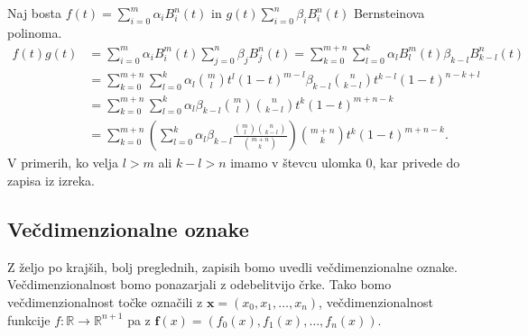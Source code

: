 \documentclass[isrm2, tisk]{fmfdelo}
\newcommand{\R}{\mathbb R}
\begin{document}
    \begin{dokaz} Naj bosta $f(t)=\sum_{i=0}^{m}\alpha_iB_i^n(t)$ in $g(t)\sum_{i=0}^{n}\beta_iB_i^n(t)$ Bernsteinova polinoma.
        \begin{align*}
            f(t)g(t) &=\sum_{i=0}^{m}\alpha_iB_{i}^{m}(t)\sum_{j=0}^{n}\beta_jB_{j}^{n}(t) = \sum_{k=0}^{m+n}\sum_{l=0}^k \alpha_lB_{l}^{m}(t)\beta_{k-l}B_{k-l}^{n}(t) \\
            &= \sum_{k=0}^{m+n}\sum_{l=0}^k \alpha_l \binom{m}{l}t^{l}(1-t)^{m-l} \beta_{k-l} \binom{n}{k-l}t^{k-l}(1-t)^{n-k+l} \\
            &= \sum_{k=0}^{m+n}\sum_{l=0}^k \alpha_l \beta_{k-l} \binom{m}{l}\binom{n}{k-l}t^{k}(1-t)^{m+n-k} \\
            &= \sum_{k=0}^{m+n} \left(\sum_{l=0}^k  \alpha_l \beta_{k-l}\frac{\binom{m}{l}\binom{n}{k-l}}{\binom{m+n}{k}}\right) \binom{m+n}{k} t^{k}(1-t)^{m+n-k}.
        \end{align*}
        V primerih, ko velja $l>m$ ali $k-l>n$ imamo v števcu ulomka $0$, kar privede do zapisa iz izreka.\\
    \end{dokaz}
    \subsection{Večdimenzionalne oznake}
    Z željo po krajših, bolj preglednih, zapisih bomo uvedli večdimenzionalne oznake.
    Večdimenzionalnost bomo ponazarjali z odebelitvijo črke.
    Tako bomo večdimenzionalnost točke označili z $\mathbf{x}=(x_0,x_1,\dots,x_n)$, večdimenzionalnost funkcije $f:\R\to\R^{n+1}$ pa z $\mathbf{f}(x)=\left( f_0(x),f_1(x),\dots,f_n(x) \right)$.
\end{document}
